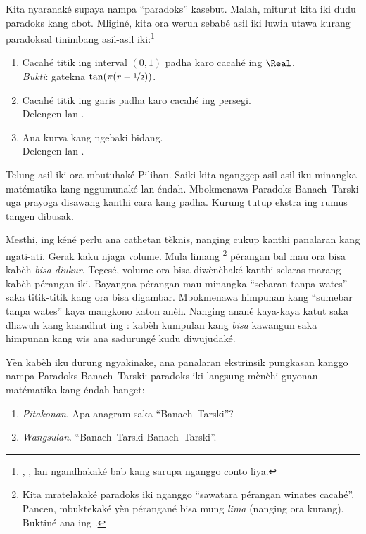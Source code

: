 \documentclass[../../../include/open-logic-section]{subfiles}
\begin{document}
Kita nyaranaké supaya nampa ``paradoks'' kasebut. Malah, miturut kita
iki dudu paradoks kang abot. Mliginé, kita ora weruh sebabé asil iki
luwih utawa kurang paradoksal tinimbang asil-asil iki:\footnote{
\citet[276--7]{Potter2004}, \citet[16]{Weston2003}, lan
\citet[31, 308--9]{Wagon2016} ngandhakaké bab kang sarupa nganggo
conto liya.}
\begin{enumerate}
	\item Cacahé titik ing interval $(0,1)$ padha karo cacahé ing $\Real$.
	\\\emph{Bukti}: gatekna $\tan(\pi(r-\nicefrac{1}{2}))$.
	\item Cacahé titik ing garis padha karo cacahé ing persegi.
	\\Delengen {} lan .
	\item Ana kurva kang ngebaki bidang.
	\\Delengen {} lan .
\end{enumerate}
Telung asil iki ora mbutuhaké Pilihan. Saiki kita nganggep asil-asil
iku minangka matématika kang nggumunaké lan éndah. Mbokmenawa
Paradoks Banach--Tarski uga prayoga disawang kanthi cara kang padha.
Kurung tutup ekstra ing rumus tangen dibusak.

Mesthi, ing kéné perlu ana cathetan tèknis, nanging cukup kanthi
panalaran kang ngati-ati. Gerak kaku njaga volume. Mula limang
\footnote{Kita mratelakaké paradoks iki nganggo ``sawatara pérangan
winates cacahé''. Pancen, \citet{Robinson1947} mbuktekaké yèn
pérangané bisa mung \emph{lima} (nanging ora kurang). Buktiné ana ing
\citet[kaca~66--7]{Wagon2016}.} pérangan bal mau ora bisa kabèh
\emph{bisa diukur}. Tegesé, volume ora bisa diwènèhaké kanthi selaras marang
kabèh pérangan iki. Bayangna pérangan mau minangka
``sebaran tanpa wates'' saka titik-titik kang ora bisa digambar.
Mbokmenawa himpunan kang ``sumebar tanpa wates'' kaya mangkono
katon anèh. Nanging anané kaya-kaya katut saka dhawuh kang kaandhut
ing \stagesacc{}: kabèh kumpulan kang \emph{bisa} kawangun saka
himpunan kang wis ana sadurungé kudu diwujudaké.

Yèn kabèh iku durung ngyakinake, ana panalaran ekstrinsik pungkasan
kanggo nampa Paradoks Banach--Tarski: paradoks iki langsung mènèhi
guyonan matématika kang éndah banget:
\begin{enumerate}
	\item[] \emph{Pitakonan}. Apa anagram saka ``Banach--Tarski''?
	\item[] \emph{Wangsulan}. ``Banach--Tarski Banach--Tarski''.
\end{enumerate}
\end{document}
